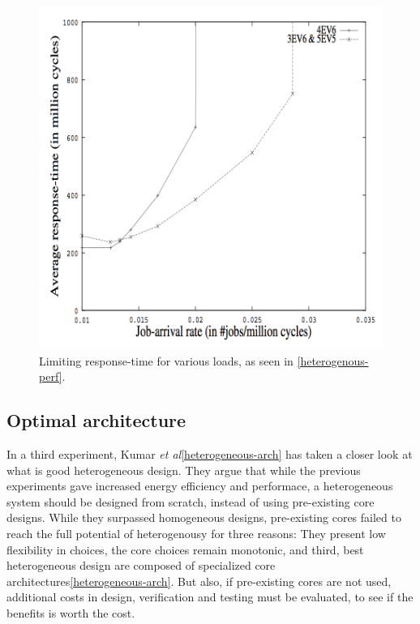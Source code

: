 \begin{figure}[htb]
    \centering
    \includegraphics[width=1.0\textwidth]{Figures/Heterogeneous/Kumar3}
    \caption{Limiting response-time for various loads, as seen in \ref{heterogenous-perf}.}
    \label{fig:Kumar3}
\end{figure}

\subsection{Optimal architecture}
In a third experiment, Kumar \textit{et al}\ref{heterogeneous-arch} has taken a closer look at what is good heterogeneous design.
They argue that while the previous experiments gave increased energy efficiency and performace, a heterogeneous system should be designed from scratch, instead of using pre-existing core designs.
While they surpassed homogeneous designs, pre-existing cores failed to reach the full potential of heterogenousy for three reasons: They present low flexibility in choices, the core choices remain monotonic, and third, best heterogeneous design are composed of specialized core architectures\ref{heterogeneous-arch}.
But also, if pre-existing cores are not used, additional costs in design, verification and testing must be evaluated, to see if the benefits is worth the cost.

